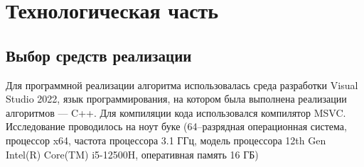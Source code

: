 \chapter{Технологическая часть}

\section{Выбор средств реализации}
Для программной реализации алгоритма использовалась среда разработки Visual Studio
2022, язык программирования, на котором была выполнена реализации алгоритмов — C++.
Для компиляции кода использовался компилятор MSVC. Исследование проводилось на ноут
буке (64–разрядная операционная система, процессор x64, частота процессора 3.1 ГГц, модель
процессора 12th Gen Intel(R) Core(TM) i5-12500H, оперативная память 16 ГБ) \par
